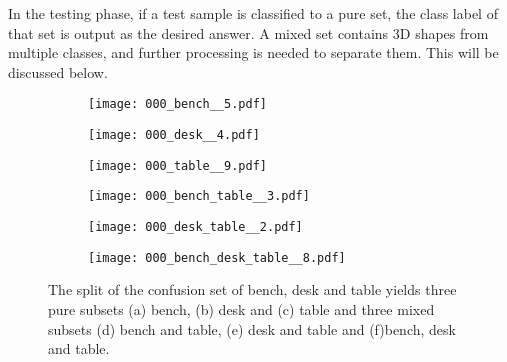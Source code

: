 \documentclass[preprint,12pt]{elsarticle}
\begin{document}
In the testing phase, if a test sample is classified to a pure set,
the class label of that set is output as the desired answer.  A mixed
set contains 3D shapes from multiple classes, and further processing
is needed to separate them. This will be discussed below. 

\begin{figure}[t]
\centering
\begin{subfigure}[b] {0.3\linewidth}
\centering
\texttt{[image: 000\_bench\_\_5.pdf]}
\caption{ }
\end{subfigure}
\centering
\begin{subfigure}[b] {0.3\linewidth}
\centering
\texttt{[image: 000\_desk\_\_4.pdf]}
\caption{ }
\end{subfigure}
\centering
\begin{subfigure}[b] {0.3\linewidth}
\centering
\texttt{[image: 000\_table\_\_9.pdf]}
\caption{ }
\end{subfigure}
\centering
\begin{subfigure}[b] {0.3\linewidth}
\centering
\texttt{[image: 000\_bench\_table\_\_3.pdf]}
\caption{ }
\end{subfigure}
\centering
\begin{subfigure}[b] {0.3\linewidth}
\centering
\texttt{[image: 000\_desk\_table\_\_2.pdf]}
\caption{ }
\end{subfigure}
\centering
\begin{subfigure}[b] {0.3\linewidth}
\centering
\texttt{[image: 000\_bench\_desk\_table\_\_8.pdf]}
\caption{ }
\end{subfigure}
\caption{The split of the confusion set of bench, desk and table yields
three pure subsets (a) bench, (b) desk and (c) table and three
mixed subsets (d) bench and table, (e) desk and table and (f)bench, desk 
and table. }\label{fig.confClustering1}
\end{figure}
\end{document}
